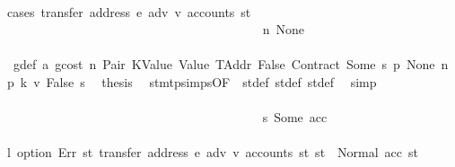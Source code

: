 \begin{isabellebody}
\ \ \ \ \ \ \ \ \ \ \ \ \ \ \ \ \ \ \ \ \ \ \ \ \ \ \ \ \ \ \ \ \ \ \ \ \ \ \isamarkupfalse%
\ {\isacharparenleft}{\kern0pt}cases\ {\isachardoublequoteopen}transfer\ {\isacharparenleft}{\kern0pt}address\ e{\isacharparenright}{\kern0pt}\ adv\ v{\isacharprime}{\kern0pt}\ {\isacharparenleft}{\kern0pt}accounts\ st{\isacharprime}{\kern0pt}{\isacharprime}{\kern0pt}{\isacharprime}{\kern0pt}{\isacharparenright}{\kern0pt}{\isachardoublequoteclose}{\isacharparenright}{\kern0pt}\isanewline
\ \ \ \ \ \ \ \ \ \ \ \ \ \ \ \ \ \ \ \ \ \ \ \ \ \ \ \ \ \ \ \ \ \ \ \ \ \ \ \ \isamarkupfalse%
\ n{}{\isacharcolon}{\kern0pt}\ None\isanewline
\ \ \ \ \ \ \ \ \ \ \ \ \ \ \ \ \ \ \ \ \ \ \ \ \ \ \ \ \ \ \ \ \ \ \ \ \ \ \ \ \isamarkupfalse%
\ {}{\isacharparenleft}{\kern0pt}{}{\isacharparenright}{\kern0pt}\ g{\isacharunderscore}{\kern0pt}def\ a{}\ gcost\ n\ Pair\ KValue\ Value\ TAddr\ False\ Contract\ Some\ s{}\ p{}\ None\ n{}\ p{}\ k{}\ v\ False\ s{}\ \isamarkupfalse%
\ {\isacharquery}{\kern0pt}thesis\ \isamarkupfalse%
\ stmt{\isachardot}{\kern0pt}psimps{\isacharparenleft}{\kern0pt}{}{\isacharparenright}{\kern0pt}{\isacharbrackleft}{\kern0pt}OF\ {}{\isacharparenleft}{\kern0pt}{}{\isacharparenright}{\kern0pt}{\isacharbrackright}{\kern0pt}\ st{\isacharprime}{\kern0pt}{\isacharunderscore}{\kern0pt}def\ st{\isacharprime}{\kern0pt}{\isacharprime}{\kern0pt}{\isacharunderscore}{\kern0pt}def\ st{\isacharprime}{\kern0pt}{\isacharprime}{\kern0pt}{\isacharprime}{\kern0pt}{\isacharunderscore}{\kern0pt}def\ \isamarkupfalse%
\ simp\isanewline
\ \ \ \ \ \ \ \ \ \ \ \ \ \ \ \ \ \ \ \ \ \ \ \ \ \ \ \ \ \ \ \ \ \ \ \ \ \ \isamarkupfalse%
\isanewline
\ \ \ \ \ \ \ \ \ \ \ \ \ \ \ \ \ \ \ \ \ \ \ \ \ \ \ \ \ \ \ \ \ \ \ \ \ \ \ \ \isamarkupfalse%
\ s{}{\isacharcolon}{\kern0pt}\ {\isacharparenleft}{\kern0pt}Some\ acc{\isacharparenright}{\kern0pt}\isanewline
\ \ \ \ \ \ \ \ \ \ \ \ \ \ \ \ \ \ \ \ \ \ \ \ \ \ \ \ \ \ \ \ \ \ \ \ \ \ \ \ \isamarkupfalse%
\ \isamarkupfalse%
\ l{}{}{\isacharcolon}{\kern0pt}\ {\isachardoublequoteopen}option\ Err\ {\isacharparenleft}{\kern0pt}{\isasymlambda}st{\isachardot}{\kern0pt}\ transfer\ {\isacharparenleft}{\kern0pt}address\ e{\isacharparenright}{\kern0pt}\ adv\ v{\isacharprime}{\kern0pt}\ {\isacharparenleft}{\kern0pt}accounts\ st{\isacharparenright}{\kern0pt}{\isacharparenright}{\kern0pt}\ st{\isacharprime}{\kern0pt}{\isacharprime}{\kern0pt}{\isacharprime}{\kern0pt}\ {\isacharequal}{\kern0pt}\ Normal\ {\isacharparenleft}{\kern0pt}acc{\isacharcomma}{\kern0pt}\ st{\isacharprime}{\kern0pt}{\isacharprime}{\kern0pt}{\isacharprime}{\kern0pt}{\isacharparenright}{\kern0pt}{\isachardoublequoteclose}\ \isamarkupfalse%

\end{isabellebody}
